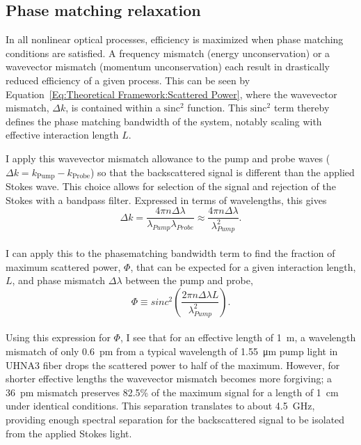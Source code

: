 \subsection{Phase matching relaxation}
\label{Theoretical Framework: Phase matching relaxation}
In all nonlinear optical processes, efficiency is maximized when phase matching conditions are satisfied. A frequency mismatch (energy unconservation) or a wavevector mismatch (momentum unconservation) each result in drastically reduced efficiency of a given process.\cite{maker1962effects} This can be seen by Equation~\ref{Eq:Theoretical Framework:Scattered Power}, where the wavevector mismatch, \(\Delta k\), is contained within a \(\mathrm{sinc^2}\) function. This \(\mathrm{sinc^2}\) term thereby defines the phase matching bandwidth of the system, notably scaling with effective interaction length \(L\).

I apply this wavevector mismatch allowance to the pump and probe waves (\(\Delta k = k_{\mathrm{Pump}} - k_{\mathrm{Probe}}\)) so that the backscattered signal is different than the applied Stokes wave. This choice allows for selection of the signal and rejection of the Stokes with a bandpass filter. Expressed in terms of wavelengths, this gives
\\
\begin{equation}
  \Delta k = \frac{4\pi n\Delta\lambda}{\lambda_{Pump}\lambda_{Probe}} \approx \frac{4\pi n\Delta\lambda}{\lambda_{Pump}^{2}}.
\end{equation}
\\
I can apply this to the phasematching bandwidth term to find the fraction of maximum scattered power, \(\Phi\), that can be expected for a given interaction length, \(L\), and phase mismatch \(\Delta\lambda\) between the pump and probe,
\\
\begin{equation}
  \Phi \equiv sinc^{2}\left(\frac{2\pi n\Delta\lambda L}{\lambda_{Pump}^{2}}\right).
  \label{Eq:Phi}
\end{equation}
\\
Using this expression for \(\Phi\), I see that for an effective length of \SI{1}{\meter}, a wavelength mismatch of only \SI{0.6}{\pico\meter} from a typical wavelength of \SI{1.55}{\micro\meter} pump light in \ac{UHNA3} fiber drops the scattered power to half of the maximum. However, for shorter effective lengths the wavevector mismatch becomes more forgiving; a \SI{36}{\pico\meter} mismatch preserves 82.5\% of the maximum signal for a length of \SI{1}{\centi\meter} under identical conditions. This separation translates to about \SI{4.5}{\giga\hertz}, providing enough spectral separation for the backscattered signal to be isolated from the applied Stokes light.

